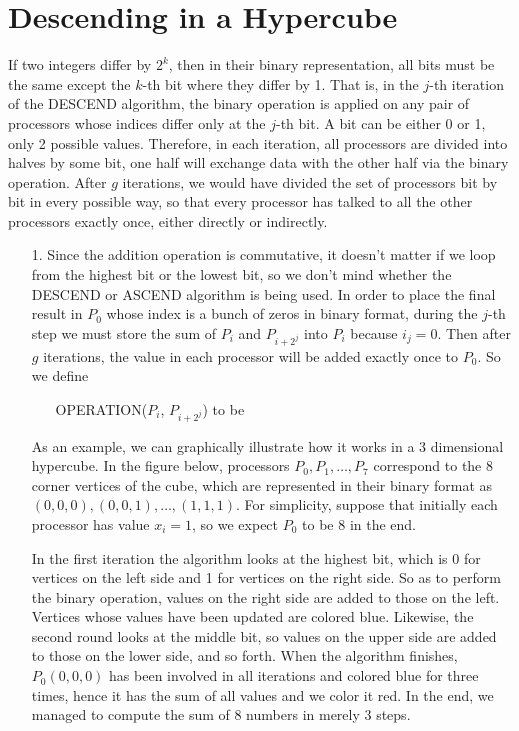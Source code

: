 \documentclass[11pt]{article}
\begin{document}
  \section{Descending in a Hypercube}
  If two integers differ by $2^k$, then in their binary representation, all bits must be the same except the $k$-th bit where they differ by 1. That is, in the $j$-th iteration of the D\footnotesize ESCEND \normalsize algorithm, the binary operation is applied on any pair of processors whose indices differ only at the $j$-th bit. A bit can be either 0 or 1, only 2 possible values. Therefore, in each iteration, all processors are divided into halves by some bit, one half will exchange data with the other half via the binary operation. After $g$ iterations, we would have divided the set of processors bit by bit in every possible way, so that every processor has talked to all the other processors exactly once, either directly or indirectly.
  \begin{enumerate}[leftmargin=*]
    \item[1.] Since the addition operation is commutative, it doesn't matter if we loop from the highest bit or the lowest bit, so we don't mind whether the D\footnotesize ESCEND \normalsize or A\footnotesize SCEND \normalsize algorithm is being used. In order to place the final result in $P_0$ whose index is a bunch of zeros in binary format, during the $j$-th step we must store the sum of $P_i$ and $P_{i+2^j}$ into $P_i$ because $i_j=0$. Then after $g$ iterations, the value in each processor will be added exactly once to $P_0$. So we define
    \begin{enumerate}
        \item[] O\footnotesize PERATION\normalsize($P_i$, $P_{i+2^j}$) to be 
    \end{enumerate}
    As an example, we can graphically illustrate how it works in a 3 dimensional hypercube. In the figure below, processors $P_0,P_1,\dots,P_7$ correspond to the 8 corner vertices of the cube, which are represented in their binary format as $(0,0,0),(0,0,1),\dots,(1,1,1)$. For simplicity, suppose that initially each processor has value $x_i=1$, so we expect $P_0$ to be 8 in the end.

    In the first iteration the algorithm looks at the highest bit, which is 0 for vertices on the left side and 1 for vertices on the right side. So as to perform the binary operation, values on the right side are added to those on the left. Vertices whose values have been updated are colored blue. Likewise, the second round looks at the middle bit, so values on the upper side are added to those on the lower side, and so forth. When the algorithm finishes, $P_0(0,0,0)$ has been involved in all iterations and colored blue for three times, hence it has the sum of all values and we color it red. In the end, we managed to compute the sum of 8 numbers in merely 3 steps.
  \end{enumerate}
\end{document}
